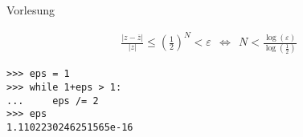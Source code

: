 Vorlesung

\begin{align*}
\frac{|z - \overline{z}|}{|z|} \leq \left( \frac{1}{2}\right)^N < \varepsilon~~
\Leftrightarrow~~ N < \frac{\log(\varepsilon)}{\log(\frac{1}{2})}
\end{align*}

\begin{verbatim}
>>> eps = 1
>>> while 1+eps > 1:
...     eps /= 2
>>> eps
1.1102230246251565e-16
\end{verbatim}